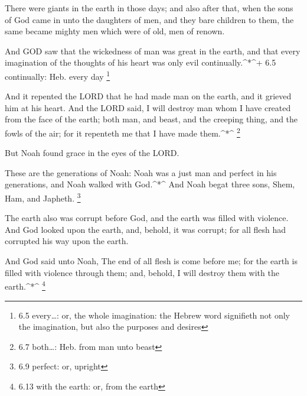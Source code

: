  There were giants in the earth in those days; and also
after that, when the sons of God came in unto the daughters of men, and
they bare children to them, the same became mighty men which were of
old, men of renown.

 And GOD saw that the wickedness of man was great in the
earth, and that every imagination of the thoughts of his heart was only
evil continually.\^{}*\^{}+ 6.5 continually: Heb. every day \footnote{6.5
  every\ldots: or, the whole imagination: the Hebrew word signifieth not
  only the imagination, but also the purposes and desires}

 And it repented the LORD that he had made man on the earth,
and it grieved him at his heart.  And the LORD said, I will
destroy man whom I have created from the face of the earth; both man,
and beast, and the creeping thing, and the fowls of the air; for it
repenteth me that I have made them.\^{}*\^{} \footnote{6.7 both\ldots:
  Heb. from man unto beast}

 But Noah found grace in the eyes of the LORD.

 These are the generations of Noah: Noah was a just man and
perfect in his generations, and Noah walked with God.\^{}*\^{}
 And Noah begat three sons, Shem, Ham, and Japheth.
\footnote{6.9 perfect: or, upright}

 The earth also was corrupt before God, and the earth was
filled with violence.  And God looked upon the earth, and,
behold, it was corrupt; for all flesh had corrupted his way upon the
earth.

 And God said unto Noah, The end of all flesh is come
before me; for the earth is filled with violence through them; and,
behold, I will destroy them with the earth.\^{}*\^{} \footnote{6.13 with
  the earth: or, from the earth}

